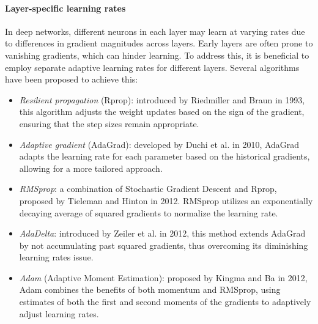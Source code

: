 \paragraph*{Layer-specific learning rates}
In deep networks, different neurons in each layer may learn at varying rates due to differences in gradient magnitudes across layers. 
Early layers are often prone to vanishing gradients, which can hinder learning. 
To address this, it is beneficial to employ separate adaptive learning rates for different layers.
Several algorithms have been proposed to achieve this:
\begin{itemize}
    \item \textit{Resilient propagation} (Rprop): introduced by Riedmiller and Braun in 1993, this algorithm adjusts the weight updates based on the sign of the gradient, ensuring that the step sizes remain appropriate.
    \item \textit{Adaptive gradient} (AdaGrad): developed by Duchi et al. in 2010, AdaGrad adapts the learning rate for each parameter based on the historical gradients, allowing for a more tailored approach.
    \item \textit{RMSprop}: a combination of Stochastic Gradient Descent and Rprop, proposed by Tieleman and Hinton in 2012. RMSprop utilizes an exponentially decaying average of squared gradients to normalize the learning rate.
    \item \textit{AdaDelta}: introduced by Zeiler et al. in 2012, this method extends AdaGrad by not accumulating past squared gradients, thus overcoming its diminishing learning rates issue.
    \item \textit{Adam} (Adaptive Moment Estimation): proposed by Kingma and Ba in 2012, Adam combines the benefits of both momentum and RMSprop, using estimates of both the first and second moments of the gradients to adaptively adjust learning rates.
\end{itemize}